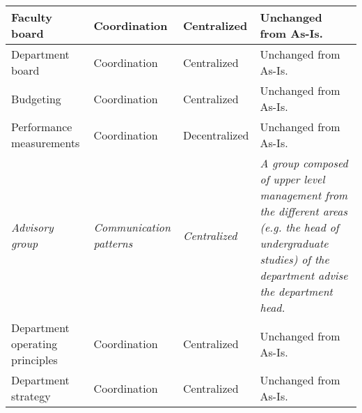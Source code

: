 \begin{center}
\begin{longtable}{ | p{} | p{}| p{} | p{}|}
 Faculty board &
 Coordination &
 Centralized &
 Unchanged from As-Is. \\
%
\hline
%
%
 Department board &
 Coordination &
 Centralized &
 Unchanged from As-Is. \\
%
\hline
%
 Budgeting &
 Coordination &
 Centralized &
 Unchanged from As-Is. \\
%
\hline
%
%
 Performance measurements &
 Coordination &
 Decentralized &
 Unchanged from As-Is.  \\
%
\hline
%
 \textit{Advisory group} &
 \textit{Communication patterns} &
 \textit{Centralized} &
 \textit{A group composed of upper level management from the different areas (e.g. the head of undergraduate studies) of the department advise the department head.} \\
%
\hline
%
%
 Department operating principles &
 Coordination &
 Centralized &
 Unchanged from As-Is. \\
%
\hline
%
%
 Department strategy &
 Coordination &
 Centralized &
 Unchanged from As-Is. \\
%
\hline

\end{longtable}
\end{center}

